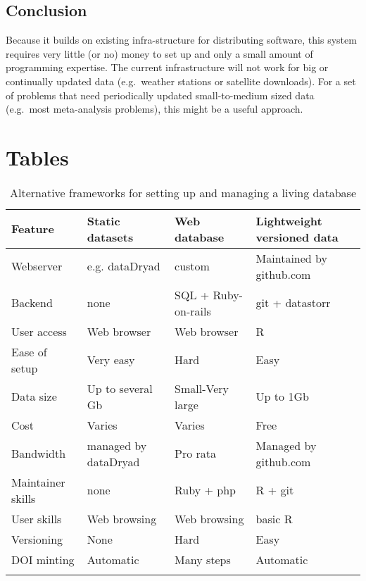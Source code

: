 \documentclass[a4paper,11pt]{article}
\begin{document}
\subsection{Conclusion}

Because it builds on existing infra-structure for distributing software,
this system requires very little (or no) money to set up and only a
small amount of programming expertise. The current infrastructure will
not work for big or continually updated data (e.g.~weather stations or
satellite downloads). For a set of problems that need periodically
updated small-to-medium sized data (e.g.~most meta-analysis problems),
this might be a useful approach.

\newpage

\section{Tables}

\begin{table}[h!]
\centering
\caption{Alternative frameworks for setting up and managing a living database}
{\footnotesize
\vspace{1cm}
  \begin{tabular}{p{2.5cm}p{3.5cm}p{3.5cm}p{4cm}}
  \hline
  \textbf{Feature} & \textbf{Static datasets}& \textbf{Web database} & \textbf{Lightweight versioned data}\\
  \hline
   Webserver        & e.g. dataDryad & custom                          &  Maintained by github.com\\
   Backend          & none & SQL + Ruby-on-rails 			& git + datastorr \\
   User access      & Web browser & Web browser 				    & R \\
   Ease of setup    & Very easy & Hard 							& Easy\\ %
   Data size        & Up to several Gb & Small-Very large 				& Up to 1Gb\\
   Cost             & Varies & Varies  						& Free \\
   Bandwidth        &managed by dataDryad & Pro rata 						& Managed by github.com\\
   Maintainer skills &none & Ruby + php 					& R + git \\
   User skills      &Web browsing& Web browsing  					& basic R \\
   Versioning       &None& Hard 							& Easy \\
   DOI minting      &Automatic & Many steps 					& Automatic \\
  \hline 
  \\
 
  \end{tabular}
  } 
\label{tab:sql_v_versioneddata}
\end{table}
\end{document}
